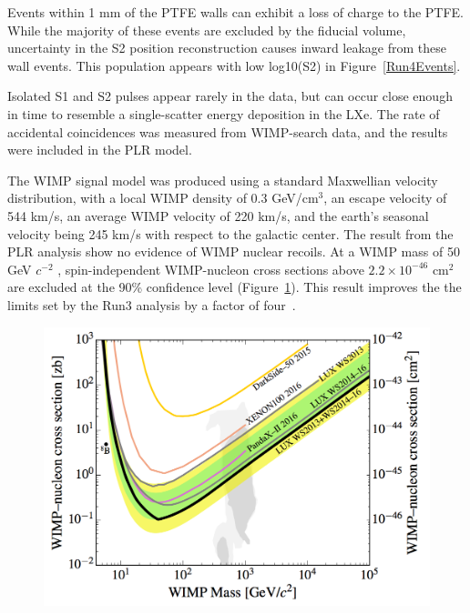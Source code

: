 Events within 1 mm of the PTFE walls can exhibit a loss of charge to the PTFE.  While the majority of these events are excluded by the fiducial volume, uncertainty in the S2 position reconstruction causes inward leakage from these wall events.  This population appears with low log10(S2) in Figure~\ref{Run4Events}.

 Isolated S1 and S2 pulses appear rarely in the data, but can occur close enough in time to resemble a single-scatter energy deposition in the LXe.  The rate of accidental coincidences was measured from WIMP-search data, and the results were included in the PLR model.

The WIMP signal model was produced using a standard Maxwellian velocity distribution, with a local WIMP density of 0.3 GeV/cm$^3$, an escape velocity of 544 km/s, an average WIMP velocity of 220 km/s, and the earth’s seasonal velocity being 245 km/s with respect to the galactic center.  The result from the PLR analysis show no evidence of WIMP nuclear recoils.  At a WIMP mass of 50  GeV $c^{-2}$ , spin-independent WIMP-nucleon cross sections above $2.2\times10^{-46}$ cm$^2$ are excluded at the 90\% confidence level (Figure~\ref{Run4Limit}).  This result improves the the limits set by the Run3 analysis by a factor of four~\cite{Akerib:2015rjg}.

 \begin{figure} 
\includegraphics[scale=.4]{Run4Limit.png} 
\label{Run4Limit}
\end{figure}

